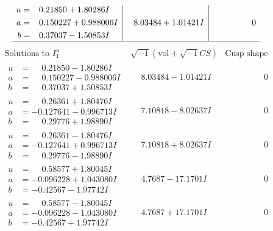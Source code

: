 \documentclass[1p]{elsarticle_modified}
\theoremstyle{definition}
\newcommand{\I}{\sqrt{-1}}
\begin{document}
$$\begin{array}{c|c|c}
\begin{aligned}
u &= \phantom{-}0.21850 + 1.80286 I \\
a &= \phantom{-}0.150227 + 0.988006 I \\
b &= \phantom{-}0.37037 - 1.50853 I\end{aligned}
 & \phantom{-}8.03484 + 1.01421 I & \phantom{-0.000000 } 0\\
 \hline 
 \end{array}$$\newpage$$\begin{array}{c|c|c}  
\text{Solutions to }I^u_{1}& \I (\text{vol} + \sqrt{-1}CS) & \text{Cusp shape}\\
 \hline 
\begin{aligned}
u &= \phantom{-}0.21850 - 1.80286 I \\
a &= \phantom{-}0.150227 - 0.988006 I \\
b &= \phantom{-}0.37037 + 1.50853 I\end{aligned}
 & \phantom{-}8.03484 - 1.01421 I & \phantom{-0.000000 } 0 \\ \hline\begin{aligned}
u &= \phantom{-}0.26361 + 1.80476 I \\
a &= -0.127641 - 0.996713 I \\
b &= \phantom{-}0.29776 + 1.98890 I\end{aligned}
 & \phantom{-}7.10818 - 8.02637 I & \phantom{-0.000000 } 0 \\ \hline\begin{aligned}
u &= \phantom{-}0.26361 - 1.80476 I \\
a &= -0.127641 + 0.996713 I \\
b &= \phantom{-}0.29776 - 1.98890 I\end{aligned}
 & \phantom{-}7.10818 + 8.02637 I & \phantom{-0.000000 } 0 \\ \hline\begin{aligned}
u &= \phantom{-}0.58577 + 1.80045 I \\
a &= -0.096228 + 1.043080 I \\
b &= -0.42567 - 1.97742 I\end{aligned}
 & \phantom{-}4.7687 - 17.1701 I & \phantom{-0.000000 } 0 \\ \hline\begin{aligned}
u &= \phantom{-}0.58577 - 1.80045 I \\
a &= -0.096228 - 1.043080 I \\
b &= -0.42567 + 1.97742 I\end{aligned}
 & \phantom{-}4.7687 + 17.1701 I & \phantom{-0.000000 } 0 \\ \hline\begin{aligned}

\end{aligned}
\end{array}$$
\end{document}
